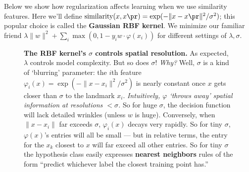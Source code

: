   Below we show how regularization affects learning when we use similarity
  features.  Here we'll define $\text{similarity}(x,x\pr) =
  \exp(-\|x-x\pr\|^2/\sigma^2)$; this popular choice is called the
  \textbf{Gaussian RBF kernel}.
      We minimize our familiar friend $\lambda \|w\|^2 + \sum_{i} \max(0,1-y_i
      w \cdot \varphi(x_i))$ for different settings of $\lambda, \sigma$.
  \begin{figure}[h]
      \centering%
    \caption{%
      \textbf{The RBF kernel's $\sigma$ controls spatial resolution.}
        As expected, $\lambda$ controls model complexity.  But so
        does $\sigma$!
        \emph{Why?}  Well, $\sigma$ is a kind
        of `blurring' parameter: the $i$th feature
        $\varphi_i(x)=\exp(-\|x-x_i\|^2/\sigma^2)$ is nearly constant once $x$
        gets closer than $\sigma$ to the landmark $x_i$.  \emph{Intuitively, $\varphi$
        `throws away' spatial information at resolutions $<\sigma$.}
        So for huge $\sigma$, the decision function will lack detailed wrinkles
        (unless $w$ is huge).
        Conversely, when $\|x-x_i\|$ far exceeds $\sigma$, $\varphi_i(x)$ decays
        very rapidly.  So for tiny $\sigma$, $\varphi(x)$'s entries will
        all be small --- but in relative terms, the entry for the
        $x_k$ closest to $x$ will far exceed all other entries.
        So for tiny $\sigma$ the hypothesis class easily expresses
        \textbf{nearest neighbors} rules of the form ``predict whichever label
        the closest training point has.''
    }
  \end{figure}


